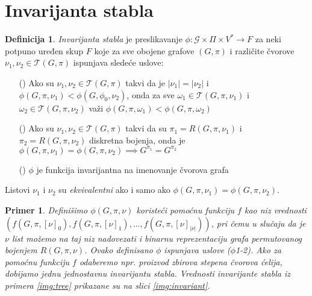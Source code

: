 \documentclass[12pt,oneside]{memoir}
\newtheorem{example}{Primer}
\theoremstyle{definition}
\newtheorem*{definition}{Definicija}
\begin{document}
 \section{Invarijanta stabla}

  \begin{definition}
	  \emph{Invarijanta stabla} je preslikavanje $\phi : \mathcal{G} \times \Pi
	  \times V^* \to F$ za neki potpuno uređen skup $F$ koje za sve obojene
	  grafove $(G, \pi)$ i različite čvorove $\nu_1, \nu_2 \in \mathcal{T}(G,
	  \pi)$ ispunjava sledeće uslove:

	  \begin{itemize}
		  \item[(\phi1)] Ako su $\nu_1, \nu_2 \in \mathcal{T}(G, \pi)$ takvi
			  da je $|\nu_1|=|\nu_2|$ i $\phi(G, \pi, \nu_1) < \phi(G,
			  \phi_0, \nu_2)$, onda za sve $\omega_1 \in \mathcal{T}(G, \pi,
			  \nu_1)$ i $\omega_2 \in \mathcal{T}(G, \pi, \nu_2)$ važi
			  $\phi(G, \pi, \omega_1) < \phi(G, \pi, \omega_2)$
		  \item[(\phi2)] Ako su $\nu_1, \nu_2 \in \mathcal{T}(G, \pi)$ takvi
			  da su $\pi_1 = R(G, \pi, \nu_1)$ i $\pi_2 = R(G, \pi, \nu_2)$
			  diskretna bojenja, onda je $\phi(G, \pi, \nu_1) = \phi(G,
			  \pi, \nu_2) \implies G^{\pi_1} = G^{\pi_2}$
		  \item[(\phi3)] $\phi$ je funkcija invarijantna na imenovanje čvorova
			  grafa
	  \end{itemize}

	  Listovi $\nu_1$ i $\nu_2$ su \emph{ekvivalentni} ako i samo ako $\phi(G,
	  \pi, \nu_1) = \phi(G, \pi, \nu_2)$.
  \end{definition}

  \begin{example}
	  Definišimo $\phi(G, \pi, \nu)$ koristeći pomoćnu funkciju $f$ kao niz
	  vrednosti $(f(G, \pi, [\nu]_0), f(G, \pi, [\nu]_1), \dots, f(G, \pi,
	  [\nu]_{|\nu|}))$, pri čemu u slučaju da je $\nu$ list možemo na taj niz
	  nadovezati i binarnu reprezentaciju grafa permutovanog bojenjem $R(G, \pi,
	  \nu)$. Ovako definisano $\phi$ ispunjava uslove ($\phi$1-2). Ako za
	  pomoćnu funkciju $f$ odaberemo npr. proizvod zbirova stepena čvorova
	  ćelija, dobijamo jednu jednostavnu invarijantu stabla. Vrednosti
	  invarijante stabla iz primera \ref{img:tree} prikazane su na slici
	  \ref{img:invariant}.
  \end{example}
\end{document}
